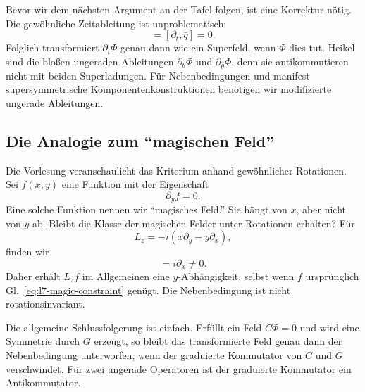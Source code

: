 Bevor wir dem nächsten Argument an der Tafel folgen, ist eine Korrektur nötig. Die gewöhnliche Zeitableitung ist unproblematisch:
\begin{equation}
[\partial_t,q]=[\partial_t,\bar q]=0.
\end{equation}
Folglich transformiert \(\partial_t\Phi\) genau dann wie ein Superfeld, wenn \(\Phi\) dies tut. Heikel sind die bloßen ungeraden Ableitungen \(\partial_\theta\Phi\) und \(\partial_{\bar\theta}\Phi\), denn sie antikommutieren nicht mit beiden Superladungen. Für Nebenbedingungen und manifest supersymmetrische Komponentenkonstruktionen benötigen wir modifizierte ungerade Ableitungen.

\subsection{Die Analogie zum ``magischen Feld''}

Die Vorlesung veranschaulicht das Kriterium anhand gewöhnlicher Rotationen. Sei \(f(x,y)\) eine Funktion mit der Eigenschaft
\begin{equation}
\partial_y f=0.
\label{eq:l7-magic-constraint}
\end{equation}
Eine solche Funktion nennen wir ``magisches Feld.'' Sie hängt von \(x\), aber nicht von \(y\) ab. Bleibt die Klasse der magischen Felder unter Rotationen erhalten? Für
\begin{equation}
L_z=-i\left(x\partial_y-y\partial_x\right),
\end{equation}
finden wir
\begin{equation}
[\partial_y,L_z]=i\partial_x\neq0.
\end{equation}
Daher erhält \(L_z f\) im Allgemeinen eine \(y\)-Abhängigkeit, selbst wenn \(f\) ursprünglich Gl.~\eqref{eq:l7-magic-constraint} genügt. Die Nebenbedingung ist nicht rotationsinvariant.

Die allgemeine Schlussfolgerung ist einfach. Erfüllt ein Feld \(C\Phi=0\) und wird eine Symmetrie durch \(G\) erzeugt, so bleibt das transformierte Feld genau dann der Nebenbedingung unterworfen, wenn der graduierte Kommutator von \(C\) und \(G\) verschwindet. Für zwei ungerade Operatoren ist der graduierte Kommutator ein Antikommutator.

